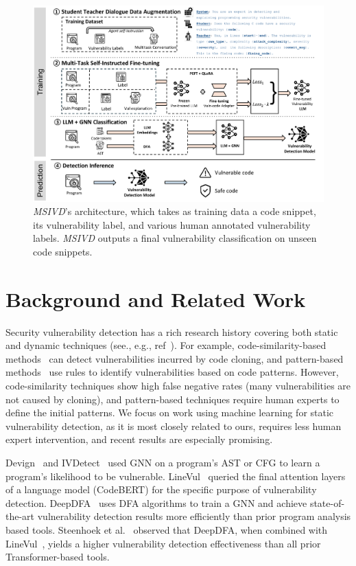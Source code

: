 \documentclass[12pt,openany,oneside,table]{cmuthesis}
\begin{document}
\begin{figure}[t!]
\centering
\includegraphics[width=\textwidth]{figures/approach/Multitask-vuln.pdf}
\caption{\small \textit{MSIVD}’s architecture, which takes as training data a code snippet, its vulnerability label, and various human annotated vulnerability labels. \textit{MSIVD} outputs a final vulnerability classification on unseen code snippets.}
\label{fig:multivuln_overview}
\end{figure}

\section{Background and Related Work}

Security vulnerability detection has a rich research history covering both static and dynamic techniques (see., e.g., ref~\cite{sokMemory,secVulSurvey,fuzzingSurvey}). For example, code-similarity-based methods~\cite{vuddy, vulpecker} can detect vulnerabilities incurred by code cloning, and pattern-based methods~\cite{neuhaus2007predicting, chucky} use rules to identify vulnerabilities based on code patterns. However, code-similarity techniques show high false negative rates (many vulnerabilities are not caused by cloning), and pattern-based techniques require human experts to define the initial patterns. We focus on work using machine learning for static vulnerability detection, as it is most closely related to ours, requires less human expert intervention, and recent results are especially promising.

Devign~\cite{zhou2019devign} and IVDetect~\cite{ivdetect} used GNN on a program's AST or CFG to learn a program's likelihood to be vulnerable. LineVul~\cite{linevd} queried the final attention layers of a language model (CodeBERT) for the specific purpose of vulnerability detection. DeepDFA~\cite{deepdfa} uses DFA algorithms to train a GNN and achieve state-of-the-art vulnerability detection results more efficiently than prior program analysis based tools. Steenhoek et al.~\cite{deepdfa} observed that DeepDFA, when combined with LineVul~\cite{linevd}, yields a higher vulnerability detection effectiveness than all prior Transformer-based tools.
\end{document}

